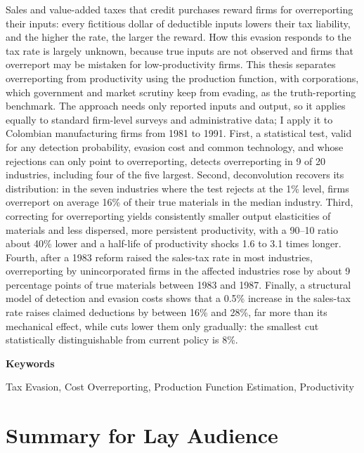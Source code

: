 \documentclass[
  12pt,
  letterpaper,
  oneside,
  openany]{report}
\newcommand{\westernheadingfont}{\normalfont\bfseries}
\newcommand{\westernkeywordsheading}{%
  \par{\westernheadingfont\fontsize{16}{19}\selectfont Keywords\par}}
\begin{document}
Sales and value-added taxes that credit purchases reward firms for
overreporting their inputs: every fictitious dollar of deductible inputs
lowers their tax liability, and the higher the rate, the larger the
reward. How this evasion responds to the tax rate is largely unknown,
because true inputs are not observed and firms that overreport may be
mistaken for low-productivity firms. This thesis separates overreporting
from productivity using the production function, with corporations,
which government and market scrutiny keep from evading, as the
truth-reporting benchmark. The approach needs only reported inputs and
output, so it applies equally to standard firm-level surveys and
administrative data; I apply it to Colombian manufacturing firms from
1981 to 1991. First, a statistical test, valid for any detection
probability, evasion cost and common technology, and whose rejections
can only point to overreporting, detects overreporting in 9 of 20
industries, including four of the five largest. Second, deconvolution
recovers its distribution: in the seven industries where the test
rejects at the 1\% level, firms overreport on average 16\% of their true
materials in the median industry. Third, correcting for overreporting
yields consistently smaller output elasticities of materials and less
dispersed, more persistent productivity, with a 90--10 ratio about 40\%
lower and a half-life of productivity shocks 1.6 to 3.1 times longer.
Fourth, after a 1983 reform raised the sales-tax rate in most
industries, overreporting by unincorporated firms in the affected
industries rose by about 9 percentage points of true materials between
1983 and 1987. Finally, a structural model of detection and evasion
costs shows that a 0.5\% increase in the sales-tax rate raises claimed
deductions by between 16\% and 28\%, far more than its mechanical
effect, while cuts lower them only gradually: the smallest cut
statistically distinguishable from current policy is 8\%.

\westernkeywordsheading

Tax Evasion, Cost Overreporting, Production Function Estimation,
Productivity


\chapter*{Summary for Lay Audience}\label{summary-for-lay-audience}

\end{document}
